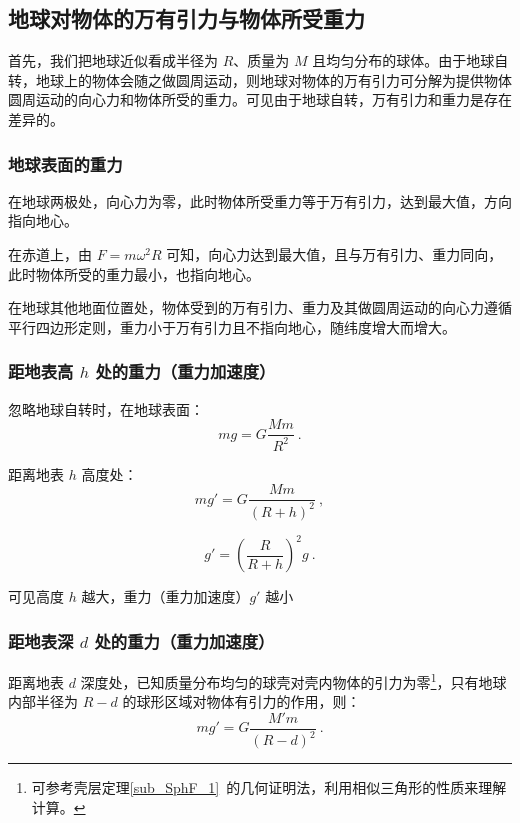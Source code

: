 \subsection{地球对物体的万有引力与物体所受重力}

首先，我们把地球近似看成半径为 $R$、质量为 $M$ 且均匀分布的球体。由于地球自转，地球上的物体会随之做圆周运动，则地球对物体的万有引力可分解为提供物体圆周运动的向心力和物体所受的重力。可见由于地球自转，万有引力和重力是存在差异的。

\subsubsection{地球表面的重力}

在地球两极处，向心力为零，此时物体所受重力等于万有引力，达到最大值，方向指向地心。

在赤道上，由 $F=m\omega^2R$ 可知，向心力达到最大值，且与万有引力、重力同向，此时物体所受的重力最小，也指向地心。

在地球其他地面位置处，物体受到的万有引力、重力及其做圆周运动的向心力遵循平行四边形定则，重力小于万有引力且不指向地心，随纬度增大而增大。

\subsubsection{距地表高 $h$ 处的重力（重力加速度）}

忽略地球自转时，在地球表面：
\begin{equation}\label{eq_HSPM06_2}
mg=G\frac{Mm}{R^2}~.
\end{equation}

距离地表 $h$ 高度处：
\begin{equation}
mg'=G\frac{Mm}{(R+h)^2}~,
\end{equation}

\begin{equation}
g'=(\frac{R}{R+h})^2g~.
\end{equation}

可见高度 $h$ 越大，重力（重力加速度）$g'$ 越小

\subsubsection{距地表深 $d$ 处的重力（重力加速度）}

距离地表 $d$ 深度处，已知质量分布均匀的球壳对壳内物体的引力为零\footnote{可参考壳层定理\autoref{sub_SphF_1}~的几何证明法，利用相似三角形的性质来理解计算。}，只有地球内部半径为 $R-d$ 的球形区域对物体有引力的作用，则：
\begin{equation}\label{eq_HSPM06_3}
mg'=G\frac{M'm}{(R-d)^2}~.
\end{equation}

